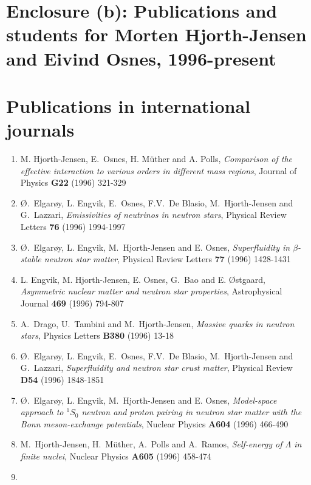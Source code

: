 

\section*{Enclosure (b): Publications and students for Morten Hjorth-Jensen and Eivind Osnes, 1996-present}

\section*{Publications in international journals}
\begin{enumerate}
\item
    M. Hjorth-Jensen, E.\ Osnes, H. M\"{u}ther and A. Polls,
    {\em Comparison of the effective interaction to various orders
         in different mass regions},
    Journal of Physics  {\bf G22} (1996) 321-329 
\item
    \O.\ Elgar\o y, L. Engvik, E.\ Osnes, F.V.\ De Blasio,
    M.\ Hjorth-Jensen and G.\ Lazzari,
    {\em Emissivities of neutrinos in neutron stars},
    Physical Review Letters {\bf 76} (1996) 1994-1997
\item
    \O.\ Elgar\o y, L. Engvik,
    M.\ Hjorth-Jensen
    and E. Osnes,
    {\em Superfluidity in $\beta$-stable neutron
         star matter},
    Physical Review Letters {\bf 77} (1996) 1428-1431
\item
    L. Engvik, M. Hjorth-Jensen, E. Osnes, G.\ Bao  and E. \O stgaard,
    {\em Asymmetric nuclear matter and neutron star properties},
    Astrophysical
    Journal {\bf 469} (1996) 794-807
\item A.\ Drago, U.\ Tambini and M.\ Hjorth-Jensen,
      {\em Massive quarks in neutron stars},
      Physics Letters {\bf B380} (1996) 13-18
\item
    \O.\ Elgar\o y, L. Engvik, E.\ Osnes, F.V.\ De Blasio,
    M.\ Hjorth-Jensen and G.\ Lazzari,
    {\em Superfluidity and  neutron star crust matter},
    Physical Review {\bf D54} (1996) 1848-1851
\item
    \O.\ Elgar\o y, L. Engvik,
    M.\ Hjorth-Jensen
    and E. Osnes,
    {\em Model-space approach to $^1S_0$ neutron and proton pairing 
      in neutron star matter with the Bonn meson-exchange potentials},
    Nuclear Physics {\bf A604} (1996) 466-490
\item M.\ Hjorth-Jensen, H.\ M\"{u}ther, A.\ Polls and A.\ Ramos,
    {\em Self-energy of $\Lambda$  in finite nuclei},
    Nuclear Physics {\bf A605} (1996) 458-474
\item

\end{enumerate}
